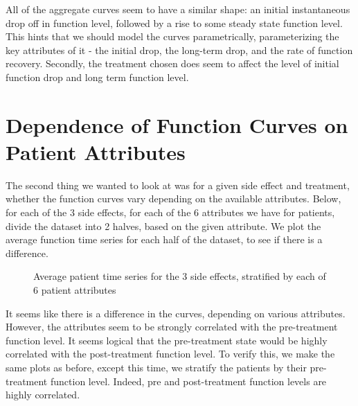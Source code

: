 All of the aggregate curves seem to have a similar shape: an initial instantaneous drop off in function level, followed by a rise to some steady state function level.  This hints that we should model the curves parametrically, parameterizing the key attributes of it - the initial drop, the long-term drop, and the rate of function recovery.  Secondly, the treatment chosen does seem to affect the level of initial function drop and long term function level.

\section{Dependence of Function Curves on Patient Attributes}

The second thing we wanted to look at was for a given side effect and treatment, whether the function curves vary depending on the available attributes.  Below, for each of the 3 side effects, for each of the 6 attributes we have for patients, divide the dataset into 2 halves, based on the given attribute.  We plot the average function time series for each half of the dataset, to see if there is a difference.

\begin{figure}
\begin{subfigure}[bowel function]{
  \texttt{[image: /Users/glareprotector/prostate\_git/glare/tex\_files/sections/explore/avg\_time\_series\_strat\_by\_attribute/bowel\_func.png]}}
\end{subfigure}
\begin{subfigure}[sexual function]{
  \texttt{[image: /Users/glareprotector/prostate\_git/glare/tex\_files/sections/explore/avg\_time\_series\_strat\_by\_attribute/sexual\_func.png]}}
\end{subfigure}
\begin{subfigure}[urinary function]{
  \texttt{[image: /Users/glareprotector/prostate\_git/glare/tex\_files/sections/explore/avg\_time\_series\_strat\_by\_attribute/urin\_func.png]}}
\end{subfigure}
\caption{Average patient time series for the 3 side effects, stratified by each of 6 patient attributes}
\end{figure}

It seems like there is a difference in the curves, depending on various attributes.  However, the attributes seem to be strongly correlated with the pre-treatment function level.  It seems logical that the pre-treatment state would be highly correlated with the post-treatment function level.  To verify this, we make the same plots as before, except this time, we stratify the patients by their pre-treatment function level.  Indeed, pre and post-treatment function levels are highly correlated.


